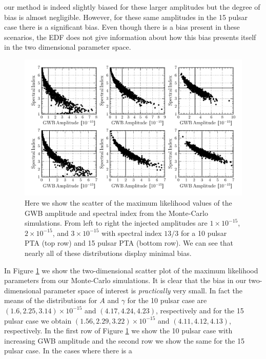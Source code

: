 \documentclass[iop]{emulateapj} \usepackage{apjfonts}
\begin{document}
our method is indeed slightly biased for these larger amplitudes but
the degree of bias is almost negligible. However, for these same
amplitudes in the 15 pulsar case there is a significant bias. Even
though there is a bias present in these scenarios, the EDF does not
give information about how this bias presents itself in the two
dimensional parameter space.
\begin{figure}[!t]
  \begin{center}
  \includegraphics[scale=1.0]{EDF_scatter.pdf}
  \end{center}
  \caption{Here we show the scatter of the maximum likelihood values
of the GWB amplitude and spectral index from the Monte-Carlo
simulations. From left to right the injected amplitudes are $1\times
10^{-15}$, $2\times 10^{-15}$, and $3\times 10^{-15}$ with spectral
index $13/3$ for a 10 pulsar PTA (top row) and 15 pulsar PTA (bottom
row). We can see that nearly all of these distributions display
minimal bias. } \label{fig:edf_scatter} \end{figure}
In Figure \ref{fig:edf_scatter} we show the two-dimensional scatter
plot of the maximum likelihood parameters from our Monte-Carlo
simulations. It is clear that the bias in our two-dimensional
parameter space of interest is \emph{practically} very small. In fact
the means of the distributions for $A$ and $\gamma$ for the 10 pulsar
case are $(1.6,2.25,3.14)\times 10^{-15}$ and $(4.17,4.24,4.23)$,
respectively and for the 15 pulsar case we obtain
$(1.56,2.29,3.22)\times 10^{-15}$ and $(4.11,4.12,4.13)$,
respectively. In the first row of Figure \ref{fig:edf_scatter} we show
the 10 pulsar case with increasing GWB amplitude and the second row we
show the same for the 15 pulsar case. In the cases where there is a
\end{document}
